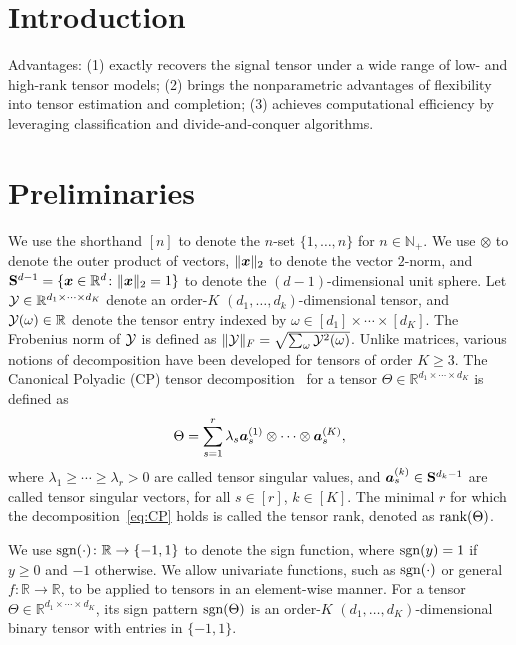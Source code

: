 \documentclass{article}
\theoremstyle{plain}
\theoremstyle{definition}
\def\sign{\textup{sgn}}
\def\rank{\textup{rank}}
\begin{document}
\section{Introduction}\label{Intro}

Advantages:
(1) exactly recovers the signal tensor under a wide range of low- and high-rank tensor models; 
(2) brings the nonparametric advantages of flexibility into tensor estimation and completion; 
(3) achieves computational efficiency by leveraging classification and divide-and-conquer algorithms.

\section{Preliminaries}
We use the shorthand $[n]$ to denote the $n$-set $\{1,\ldots,n\}$ for $n\in\mathbb{N}_{+}$. We use $\otimes$ to denote the outer product of vectors, $\lVert\bm x\rVert_2$ to denote the vector $2$-norm, and $\mathbf{S}^{d-1}=\{\bm x\in\mathbb{R}^d\colon \lVert\bm x\rVert_2=1\}$ to denote the $(d-1)$-dimensional unit sphere. Let $\mathcal{Y}\in\mathbb{R}^{d_1\times \cdots \times d_K}$ denote an order-$K$ $(d_1,\ldots,d_k)$-dimensional tensor, and $\mathcal{Y}(\omega)\in\mathbb{R}$ denote the tensor entry indexed by $\omega \in[d_1]\times \cdots \times [d_K]$. The Frobenius norm of $\mathcal{Y}$ is defined as $\lVert\mathcal{Y}\rVert_F=\sqrt{\sum_{\omega}\mathcal{Y}^2(\omega)}$. Unlike matrices, various notions of decomposition have been developed for tensors of order $K\geq 3$. The Canonical Polyadic (CP) tensor decomposition~\cite{hitchcock1927expression} for a tensor $\Theta\in\mathbb{R}^{d_1\times \cdots \times d_K}$ is defined as
\begin{equation}\label{eq:CP}
\Theta=\sum_{s=1}^r\lambda_s \bm{a}^{(1)}_s\otimes\cdots\otimes \bm{a}^{(K)}_s,
\end{equation}
where $\lambda_1\geq \cdots \geq \lambda_r>0$ are called tensor singular values, and $\bm{a}^{(k)}_s \in \mathbf{S}^{d_k-1}$ are called tensor singular vectors, for all $s\in[r]$, $k\in[K]$. The minimal $r$ for which the decomposition~\eqref{eq:CP} holds is called the tensor rank, denoted as $\rank(\Theta)$. 

We use $\sign(\cdot)\colon \mathbb{R}\to\{-1,1\}$ to denote the sign function, where $\sign(y)=1$ if $y\geq 0$ and $-1$ otherwise. We allow univariate functions, such as $\sign(\cdot)$ or general $f\colon \mathbb{R}\to\mathbb{R}$, to be applied to tensors in an element-wise manner. For a tensor $\Theta\in\mathbb{R}^{d_1\times \cdots \times d_K}$, its sign pattern $\sign(\Theta)$ is an order-$K$ $(d_1,\ldots,d_K)$-dimensional binary tensor with entries in $\{-1,1\}$. 
\end{document}
